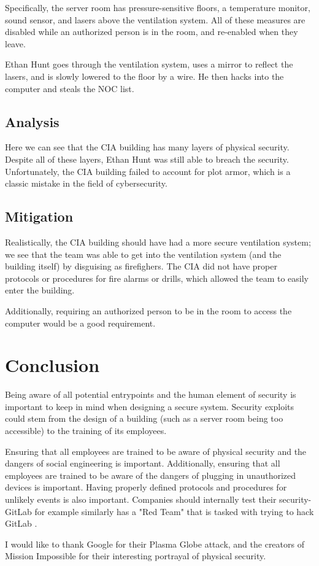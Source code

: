 \documentclass[acmsmall]{acmart}
\begin{document}
Specifically, the server room has pressure-sensitive floors, a temperature monitor,
sound sensor, and lasers above the ventilation system. All of these measures are disabled
while an authorized person is in the room, and re-enabled when they leave.

Ethan Hunt goes through the ventilation system, uses a mirror to reflect the
lasers, and is slowly lowered to the floor by a wire. He then hacks into the
computer and steals the NOC list.

\subsection{Analysis}
Here we can see that the CIA building has many layers of physical security.
Despite all of these layers, Ethan Hunt was still able to breach the security.
Unfortunately, the CIA building failed to account for plot armor, which is
a classic mistake in the field of cybersecurity.

\subsection{Mitigation}
Realistically, the CIA building should have had a more secure ventilation system;
we see that the team was able to get into the ventilation system (and the building itself)
by disguising as firefighers. The CIA did not have proper protocols or procedures
for fire alarms or drills, which allowed the team to easily enter the building.

Additionally, requiring an authorized person to be in the room to access the
computer would be a good requirement.

\section{Conclusion}
Being aware of all potential entrypoints and the human element of security is important
to keep in mind when designing a secure system. Security exploits could stem from the
design of a building (such as a server room being too accessible) to the training of
its employees.

Ensuring that all employees are trained to be aware of physical security and the dangers
of social engineering is important. Additionally, ensuring that all employees are trained
to be aware of the dangers of plugging in unauthorized devices is important. Having properly
defined protocols and procedures for unlikely events is also important.
Companies should internally test their security- GitLab for example similarly has a
"Red Team" that is tasked with trying to hack GitLab \cite{GitLab}.

\begin{acks}
  I would like to thank Google for their Plasma Globe attack, and the creators of
  Mission Impossible for their interesting portrayal of physical security.
\end{acks}



\end{document}
